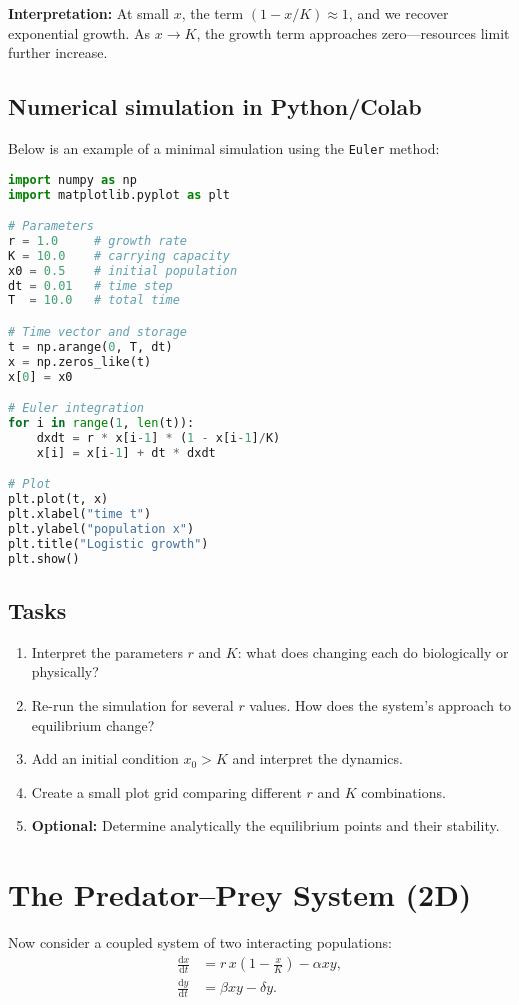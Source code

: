 \documentclass[11pt,a4paper]{article}
\newcommand{\dd}{\mathrm{d}}
\begin{document}
\textbf{Interpretation:}  
At small $x$, the term $(1 - x/K)\approx1$, and we recover exponential growth.  
As $x\to K$, the growth term approaches zero—resources limit further increase.

\subsection{Numerical simulation in Python/Colab}
Below is an example of a minimal simulation using the \texttt{Euler} method:

\begin{lstlisting}[language=Python,caption={Simple Euler integration of the logistic model}]
import numpy as np
import matplotlib.pyplot as plt

# Parameters
r = 1.0     # growth rate
K = 10.0    # carrying capacity
x0 = 0.5    # initial population
dt = 0.01   # time step
T  = 10.0   # total time

# Time vector and storage
t = np.arange(0, T, dt)
x = np.zeros_like(t)
x[0] = x0

# Euler integration
for i in range(1, len(t)):
    dxdt = r * x[i-1] * (1 - x[i-1]/K)
    x[i] = x[i-1] + dt * dxdt

# Plot
plt.plot(t, x)
plt.xlabel("time t")
plt.ylabel("population x")
plt.title("Logistic growth")
plt.show()
\end{lstlisting}

\subsection{Tasks}
\begin{enumerate}[label=\textbf{T\arabic*},leftmargin=*]
  \item Interpret the parameters $r$ and $K$: what does changing each do biologically or physically?
  \item Re-run the simulation for several $r$ values. How does the system’s approach to equilibrium change?
  \item Add an initial condition $x_0 > K$ and interpret the dynamics.
  \item Create a small plot grid comparing different $r$ and $K$ combinations.
  \item \textbf{Optional:} Determine analytically the equilibrium points and their stability.
\end{enumerate}

\section{The Predator--Prey System (2D)}
Now consider a coupled system of two interacting populations:
\begin{align}
\frac{\dd x}{\dd t} &= r\,x\!\left(1-\frac{x}{K}\right) - \alpha x y,\\
\frac{\dd y}{\dd t} &= \beta x y - \delta y.
\end{align}
\end{document}
